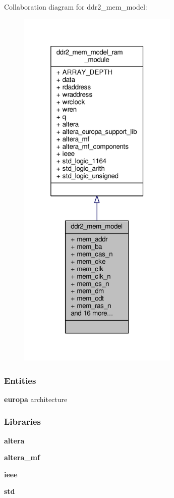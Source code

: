 Collaboration diagram for ddr2\+\_\+mem\+\_\+model\+:\nopagebreak
\begin{figure}[H]
\begin{center}
\leavevmode
\includegraphics[width=217pt]{d8/d91/classddr2__mem__model__coll__graph}
\end{center}
\end{figure}
\subsubsection*{Entities}
\begin{DoxyCompactItemize}
\item 
{\bf europa} architecture
\end{DoxyCompactItemize}
\subsubsection*{Libraries}
 \begin{DoxyCompactItemize}
\item 
{\bf altera} 
\item 
{\bf altera\+\_\+mf} 
\item 
{\bf ieee} 
\item 
{\bf std} 
\end{DoxyCompactItemize}
